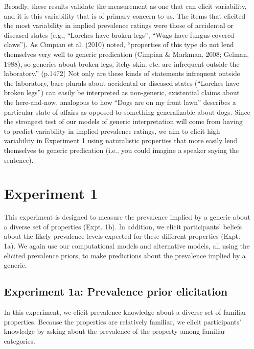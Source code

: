 \documentclass[floatsintext,doc]{apa6}
\begin{document}
Broadly, these results validate the measurement as one that can elicit variability, and it is this variability that is of primary concern to us.
The items that elicited the most variability in implied prevalence ratings were those of accidental or diseased states (e.g., \enquote{Lorches have broken legs}, \enquote{Wugs have fungus-covered claws}).
As Cimpian et al. (2010) noted, \enquote{properties of this type do not lend themselves very well to generic predication (Cimpian \& Markman, 2008; Gelman, 1988), so generics about broken legs, itchy skin, etc. are infrequent outside the laboratory.} (p.1472)
Not only are these kinds of statements infrequent outside the laboratory, bare plurals about accidental or diseased states (\enquote{Lorches have broken legs}) can easily be interpreted as non-generic, existential claims about the here-and-now, analogous to how \enquote{Dogs are on my front lawn} describes a particular state of affairs as opposed to something generalizable about dogs.
Since the strongest test of our models of generic interpretation will come from having to predict variability in implied prevalence ratings, we aim to elicit high variability in Experiment 1 using naturalistic properties that more easily lend themselves to generic predication (i.e., you could imagine a speaker saying the sentence).



\hypertarget{experiment-1}{%
\section{Experiment 1}\label{experiment-1}}

This experiment is designed to measure the prevalence implied by a generic about a diverse set of properties (Expt. 1b).
In addition, we elicit participants' beliefs about the likely prevalence levels expected for these different properties (Expt. 1a).
We again use our computational models and alternative models, all using the elicited prevalence priors, to make predictions about the prevalence implied by a generic.

\hypertarget{experiment-1a-prevalence-prior-elicitation}{%
\subsection{Experiment 1a: Prevalence prior elicitation}\label{experiment-1a-prevalence-prior-elicitation}}

In this experiment, we elicit prevalence knowledge about a diverse set of familiar properties.
Because the properties are relatively familiar, we elicit participants' knowledge by asking about the prevalence of the property among familiar categories.
\end{document}
